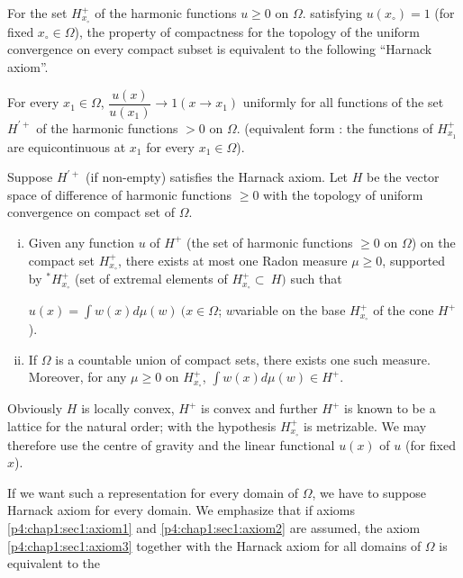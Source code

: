 \begin{lemma*} %
  For the set $H^+_{x_\circ}$ of the harmonic functions $u \ge 0$ on
  $\Omega$. satisfying $u(x_\circ) = 1$ (for fixed $x_\circ \in \Omega$), the
  property of compactness for the topology of the uniform convergence
  on every compact subset is equivalent to the following ``Harnack
  axiom''. 
\end{lemma*}

For every $x_1 \in \Omega$, $\dfrac{u(x)}{u(x_1)} \to 1 (x \to x_1)$
uniformly for all functions of the set $H^{'+} $ of the harmonic
functions $> 0$ on $\Omega$. (equivalent form : the functions of
$H^+_{x_1} $ are equicontinuous at $x_1$ for every $x_1 \in \Omega$). 

\begin{thm}\label{p4:chap10:sec41:thm35} %
  Suppose $H^{' +}$ (if non-empty) satisfies the Harnack axiom. Let $H$
  be the vector space of difference of harmonic functions $\ge 0$ with
  the topology of uniform convergence on compact set of $\Omega$. 
\end{thm}

\begin{enumerate} [(i)]
\item Given any function $u$ of $H^+$ (the set of harmonic functions
  $\ge 0$ on $\Omega$) on the compact set $H^+_{x_\circ}$, there exists at
  most one Radon measure $\mu \ge 0$, supported by $^*H^+_{x_\circ} $ (set
  of extremal elements of $H^+_{x_\circ} \subset ~ H)$ such that  
  
  $u(x) = \int w(x) d \mu (w) ~ (x \in \Omega$; $w$\pageoriginale variable on the
  base $H^+_{x_\circ}$ of the cone $H^+$). 
\item If $\Omega$ is a countable union of compact sets, there exists
  one such measure. Moreover, for any $\mu \ge 0$ on $H^+_{x_\circ}$,
  $\int w(x) d \mu (w) \in H^+$. 
\end{enumerate}

Obviously $H$ is locally convex, $H^+$ is convex and further $H^+$ is
known to be a lattice for the natural order; with the hypothesis
$H^+_{x_\circ}$ is metrizable. We may therefore use the centre of gravity
and the linear functional $u(x)$ of $u$ (for fixed $x$). 

If we want such a representation for every domain of $\Omega$, we have
to suppose Harnack axiom for every domain. We emphasize that if axioms
\ref{p4:chap1:sec1:axiom1} and \ref{p4:chap1:sec1:axiom2}
are assumed, the axiom \ref{p4:chap1:sec1:axiom3} together with the
Harnack axiom for all domains of $\Omega$ is equivalent to the  

